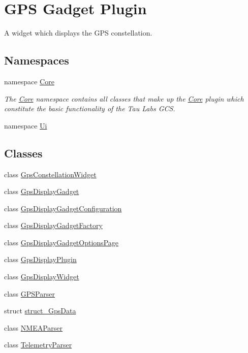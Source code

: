 \hypertarget{group___g_p_s_gadget_plugin}{\section{G\-P\-S Gadget Plugin}
\label{group___g_p_s_gadget_plugin}
}


A widget which displays the G\-P\-S constellation.  


\subsection*{Namespaces}
\begin{DoxyCompactItemize}
\item 
namespace \hyperlink{namespace_core}{Core}
\begin{DoxyCompactList}\small\item\em The \hyperlink{namespace_core}{Core} namespace contains all classes that make up the \hyperlink{namespace_core}{Core} plugin which constitute the basic functionality of the Tau Labs G\-C\-S. \end{DoxyCompactList}\item 
namespace \hyperlink{namespace_ui}{Ui}
\end{DoxyCompactItemize}
\subsection*{Classes}
\begin{DoxyCompactItemize}
\item 
class \hyperlink{class_gps_constellation_widget}{Gps\-Constellation\-Widget}
\item 
class \hyperlink{class_gps_display_gadget}{Gps\-Display\-Gadget}
\item 
class \hyperlink{class_gps_display_gadget_configuration}{Gps\-Display\-Gadget\-Configuration}
\item 
class \hyperlink{class_gps_display_gadget_factory}{Gps\-Display\-Gadget\-Factory}
\item 
class \hyperlink{class_gps_display_gadget_options_page}{Gps\-Display\-Gadget\-Options\-Page}
\item 
class \hyperlink{class_gps_display_plugin}{Gps\-Display\-Plugin}
\item 
class \hyperlink{class_gps_display_widget}{Gps\-Display\-Widget}
\item 
class \hyperlink{class_g_p_s_parser}{G\-P\-S\-Parser}
\item 
struct \hyperlink{structstruct___gps_data}{struct\-\_\-\-Gps\-Data}
\item 
class \hyperlink{class_n_m_e_a_parser}{N\-M\-E\-A\-Parser}
\item 
class \hyperlink{class_telemetry_parser}{Telemetry\-Parser}
\end{DoxyCompactItemize}
